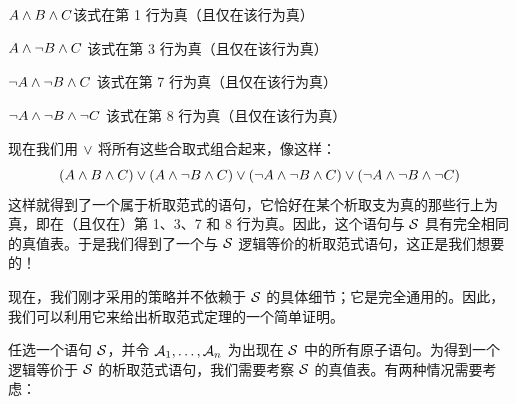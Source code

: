 \begin{compactlist}
		\item  $A \wedge B \wedge C$\hfill 该式在第 1 行为真（且仅在该行为真）
		\item $A \wedge \neg B \wedge C$ \hfill 该式在第 3 行为真（且仅在该行为真）
		\item $\neg A \wedge \neg B \wedge C$ \hfill 该式在第 7 行为真（且仅在该行为真）
		\item $\neg A \wedge \neg B \wedge \neg C$ \hfill 该式在第 8 行为真（且仅在该行为真）
	\end{compactlist}


现在我们用 $\vee$ 将所有这些合取式组合起来，像这样：
$$(A \wedge B \wedge C) \vee (A \wedge \neg B \wedge C) \vee (\neg A \wedge \neg B \wedge C) \vee (\neg A \wedge \neg B \wedge \neg C)$$\label{longDNF}
这样就得到了一个属于析取范式的语句，它恰好在某个析取支为真的那些行上为真，即在（且仅在）第 1、3、7 和 8 行为真。因此，这个语句与 $\mathcal{S}$ 具有完全相同的真值表。于是我们得到了一个与 $\mathcal{S}$ 逻辑等价的析取范式语句，这正是我们想要的！

现在，我们刚才采用的策略并不依赖于 $\mathcal{S}$ 的具体细节；它是完全通用的。因此，我们可以利用它来给出析取范式定理的一个简单证明。

任选一个语句 $\mathcal{S}$，并令 $\mathcal{A}_1, \ldots, \mathcal{A}_n$ 为出现在 $\mathcal{S}$ 中的所有原子语句。为得到一个逻辑等价于 $\mathcal{S}$ 的析取范式语句，我们需要考察 $\mathcal{S}$ 的真值表。有两种情况需要考虑：


